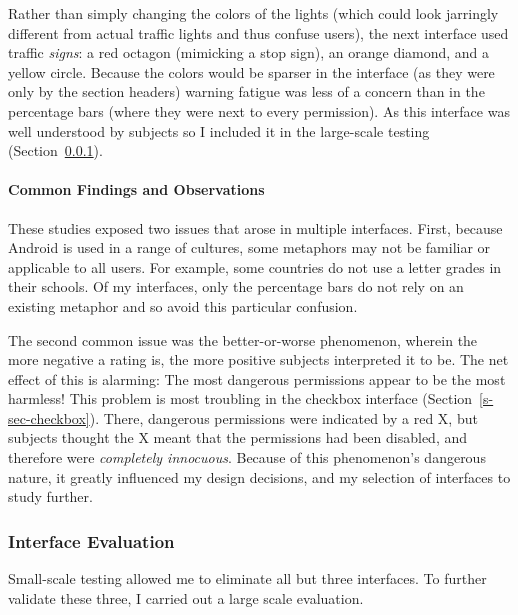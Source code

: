 \documentclass[11pt]{article}
\newcommand{\refsec}[1]{Section~\ref{#1}}
\begin{document}
\label{ss-sec-traffic-r4}

Rather than simply changing the colors of
the lights (which  
could look jarringly different from actual traffic lights and thus confuse users), 
the next interface used traffic \emph{signs}: a red octagon
(mimicking a stop sign), an orange diamond, and a yellow circle. 
Because the colors would be sparser in the interface (as they were only by the section 
headers) warning fatigue was less of
a concern than in the percentage bars 
(where they were next to every permission). 
As this interface was well understood by subjects so I included it
in the large-scale testing (\refsec{s-sec-largescale}).


\paragraph{Common Findings and Observations}
\label{common-findings}

These studies exposed two issues that arose in multiple 
interfaces. First, because Android is used in a range of 
cultures, some metaphors may not be familiar or applicable to all users.
For example, some countries 
do not use a letter grades in their schools.
Of my
interfaces, only the percentage bars do 
not rely on an existing metaphor and so avoid this particular confusion.

The second common issue was the better-or-worse phenomenon, 
wherein the more negative a rating is, the more positive subjects interpreted 
it to be. The net effect of this is alarming: The most dangerous permissions 
appear to be the most harmless! This problem is 
most troubling in the checkbox interface (\refsec{s-sec-checkbox}). 
There, dangerous permissions were indicated by a red X, but 
subjects thought the X meant that the permissions had been disabled, and therefore 
were \emph{completely innocuous}. Because of this phenomenon's dangerous nature, it greatly 
influenced my design decisions, and my selection of interfaces to study further.



\subsubsection{Interface Evaluation}
\label{s-sec-largescale}

Small-scale testing allowed me to eliminate all but three interfaces. 
To further validate these three, I carried out a large scale evaluation.
\end{document}
